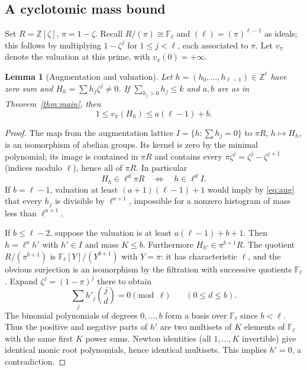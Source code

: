 \documentclass[11pt]{article}
\newtheorem{lemma}[theorem]{Lemma}
\theoremstyle{remark}\newtheorem{remark}[theorem]{Remark}
\newcommand{\F}{\mathbb F}
\newcommand{\Z}{\mathbb Z}
\begin{document}
\subsection{A cyclotomic mass bound}
Set $R=\Z[\zeta]$, $\pi=1-\zeta$. Recall $R/(\pi)\cong\F_\ell$ and $(\ell)=(\pi)^{\ell-1}$ as ideals; this follows by multiplying $1-\zeta^j$ for $1\le j<\ell$, each associated to $\pi$. Let $v_\pi$ denote the valuation at this prime, with $v_\pi(0)=+\infty$.

\begin{lemma}[Augmentation and valuation]\label{lem:mass}
Let $h=(h_0,\ldots,h_{\ell-1})\in\Z^\ell$ have zero sum and $H_h=\sum h_j\zeta^j\ne0$. If $\sum_{h_j>0}h_j\le k$ and $a,b$ are as in Theorem~\ref{thm:main}, then
\[
1\le v_\pi(H_h)\le a(\ell-1)+b.
\]
\end{lemma}
\begin{proof}
The map from the augmentation lattice $I=\{h:\sum h_j=0\}$ to $\pi R$, $h\mapsto H_h$, is an isomorphism of abelian groups. Its kernel is zero by the minimal polynomial; its image is contained in $\pi R$ and contains every $\pi\zeta^j=\zeta^j-\zeta^{j+1}$ (indices modulo $\ell$), hence all of $\pi R$. In particular
\begin{equation}\label{eq:aug}
H_h\in\ell^d\pi R\quad\Longleftrightarrow\quad h\in\ell^d I.
\end{equation}
If $b=\ell-1$, valuation at least $(a+1)(\ell-1)+1$ would imply by \eqref{eq:aug} that every $h_j$ is divisible by $\ell^{a+1}$, impossible for a nonzero histogram of mass less than $\ell^{a+1}$.

If $b\le\ell-2$, suppose the valuation is at least $a(\ell-1)+b+1$. Then $h=\ell^a h'$ with $h'\in I$ and mass $K\le b$. Furthermore $H_{h'}\in\pi^{b+1}R$. The quotient $R/(\pi^{b+1})$ is $\F_\ell[Y]/(Y^{b+1})$ with $Y=\pi$: it has characteristic $\ell$, and the obvious surjection is an isomorphism by the filtration with successive quotients $\F_\ell$. Expand $\zeta^j=(1-\pi)^j$ there to obtain
\[
\sum_j h'_j\binom{j}{d}=0\pmod\ell\qquad(0\le d\le b).
\]
The binomial polynomials of degrees $0,\ldots,b$ form a basis over $\F_\ell$ since $b<\ell$. Thus the positive and negative parts of $h'$ are two multisets of $K$ elements of $\F_\ell$ with the same first $K$ power sums. Newton identities (all $1,\ldots,K$ invertible) give identical monic root polynomials, hence identical multisets. This implies $h'=0$, a contradiction.
\end{proof}
\end{document}
